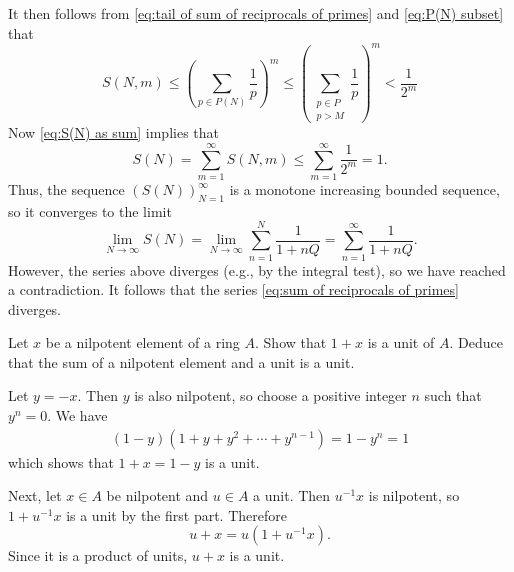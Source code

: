 \documentclass{homework}
\begin{document}
\begin{solution}
\begin{equation*}
\end{equation*}
It then follows from \eqref{eq:tail of sum of reciprocals of primes} and
\eqref{eq:P(N) subset} that
\begin{equation*}
S(N, m)
\leq \left(\sum_{p \in P(N)} \frac{1}{p}\right)^{m}
\leq \left(\sum_{\substack{p \in P \\ p > M}} \frac{1}{p}\right)^{m}
< \frac{1}{2^m}
\end{equation*}
Now \eqref{eq:S(N) as sum} implies that
\begin{equation*}
S(N)
= \sum_{m=1}^\infty S(N, m)
\leq \sum_{m=1}^\infty \frac{1}{2^m} = 1.
\end{equation*}
Thus, the sequence $(S(N))_{N=1}^\infty$ is a monotone increasing bounded
sequence, so it converges to the limit
\begin{equation*}
\lim_{N \to \infty} S(N)
= \lim_{N \to \infty} \sum_{n=1}^N \frac{1}{1 + n Q}
= \sum_{n=1}^\infty \frac{1}{1 + n Q}.
\end{equation*}
However, the series above diverges (e.g., by the integral test), so we have
reached a contradiction.
It follows that the series \eqref{eq:sum of reciprocals of primes} diverges.
\end{solution}

\begin{problem}
Let $x$ be a nilpotent element of a ring $A$.
Show that $1 + x$ is a unit of $A$.
Deduce that the sum of a nilpotent element and a unit is a unit.
\end{problem}

\begin{solution}
Let $y = -x$.
Then $y$ is also nilpotent, so choose a positive integer $n$ such that
$y^n = 0$.
We have
\begin{align*}
(1 - y) (1 + y + y^2 + \cdots + y^{n-1})
= 1 - y^n
= 1
\end{align*}
which shows that $1 + x = 1 - y$ is a unit.

Next, let $x\in A$ be nilpotent and $u\in A$ a unit.
Then $u^{-1} x$ is nilpotent, so $1 + u^{-1}x$ is a unit by the first part.
Therefore
\begin{equation*}
u + x = u(1 + u^{-1} x).
\end{equation*}
Since it is a product of units, $u + x$ is a unit.
\end{solution}
\end{document}
